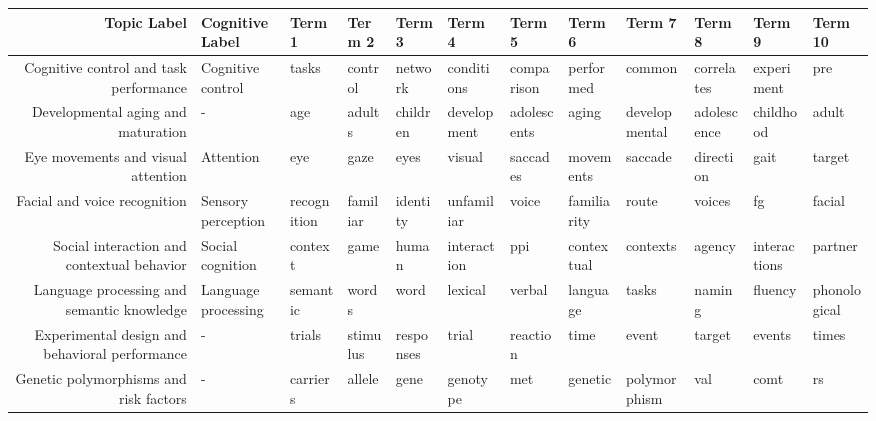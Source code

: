 \begin{tabular}{rlllllllllll}
\toprule
                                       Topic Label &     Cognitive Label &           Term 1 &        Term 2 &          Term 3 &         Term 4 &      Term 5 &         Term 6 &        Term 7 &         Term 8 &        Term 9 &        Term 10 \\
\midrule
            Cognitive control and task performance &   Cognitive control &            tasks &       control &         network &     conditions &  comparison &      performed &        common &     correlates &    experiment &            pre \\
                Developmental aging and maturation &                   - &              age &        adults &        children &    development & adolescents &          aging & developmental &    adolescence &     childhood &          adult \\
                Eye movements and visual attention &           Attention &              eye &          gaze &            eyes &         visual &    saccades &      movements &       saccade &      direction &          gait &         target \\
                      Facial and voice recognition &  Sensory perception &      recognition &      familiar &        identity &     unfamiliar &       voice &    familiarity &         route &         voices &            fg &         facial \\
        Social interaction and contextual behavior &    Social cognition &          context &          game &           human &    interaction &         ppi &     contextual &      contexts &         agency &  interactions &        partner \\
        Language processing and semantic knowledge & Language processing &         semantic &         words &            word &        lexical &      verbal &       language &         tasks &         naming &       fluency &   phonological \\
    Experimental design and behavioral performance &                   - &           trials &      stimulus &       responses &          trial &    reaction &           time &         event &         target &        events &          times \\
            Genetic polymorphisms and risk factors &                   - &         carriers &        allele &            gene &       genotype &         met &        genetic &  polymorphism &            val &          comt &             rs \\

\end{tabular}
